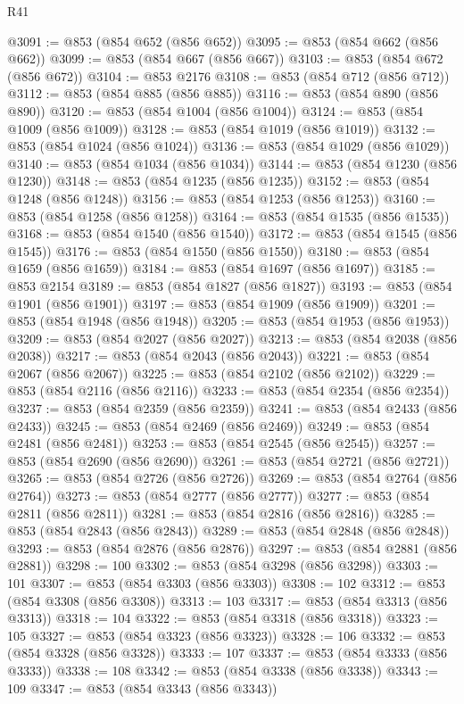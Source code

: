 \begin{lexlean}{R41}
\begin{coremodule}
@3091 := @853 (@854 @652 (@856 @652))
@3095 := @853 (@854 @662 (@856 @662))
@3099 := @853 (@854 @667 (@856 @667))
@3103 := @853 (@854 @672 (@856 @672))
@3104 := @853 @2176
@3108 := @853 (@854 @712 (@856 @712))
@3112 := @853 (@854 @885 (@856 @885))
@3116 := @853 (@854 @890 (@856 @890))
@3120 := @853 (@854 @1004 (@856 @1004))
@3124 := @853 (@854 @1009 (@856 @1009))
@3128 := @853 (@854 @1019 (@856 @1019))
@3132 := @853 (@854 @1024 (@856 @1024))
@3136 := @853 (@854 @1029 (@856 @1029))
@3140 := @853 (@854 @1034 (@856 @1034))
@3144 := @853 (@854 @1230 (@856 @1230))
@3148 := @853 (@854 @1235 (@856 @1235))
@3152 := @853 (@854 @1248 (@856 @1248))
@3156 := @853 (@854 @1253 (@856 @1253))
@3160 := @853 (@854 @1258 (@856 @1258))
@3164 := @853 (@854 @1535 (@856 @1535))
@3168 := @853 (@854 @1540 (@856 @1540))
@3172 := @853 (@854 @1545 (@856 @1545))
@3176 := @853 (@854 @1550 (@856 @1550))
@3180 := @853 (@854 @1659 (@856 @1659))
@3184 := @853 (@854 @1697 (@856 @1697))
@3185 := @853 @2154
@3189 := @853 (@854 @1827 (@856 @1827))
@3193 := @853 (@854 @1901 (@856 @1901))
@3197 := @853 (@854 @1909 (@856 @1909))
@3201 := @853 (@854 @1948 (@856 @1948))
@3205 := @853 (@854 @1953 (@856 @1953))
@3209 := @853 (@854 @2027 (@856 @2027))
@3213 := @853 (@854 @2038 (@856 @2038))
@3217 := @853 (@854 @2043 (@856 @2043))
@3221 := @853 (@854 @2067 (@856 @2067))
@3225 := @853 (@854 @2102 (@856 @2102))
@3229 := @853 (@854 @2116 (@856 @2116))
@3233 := @853 (@854 @2354 (@856 @2354))
@3237 := @853 (@854 @2359 (@856 @2359))
@3241 := @853 (@854 @2433 (@856 @2433))
@3245 := @853 (@854 @2469 (@856 @2469))
@3249 := @853 (@854 @2481 (@856 @2481))
@3253 := @853 (@854 @2545 (@856 @2545))
@3257 := @853 (@854 @2690 (@856 @2690))
@3261 := @853 (@854 @2721 (@856 @2721))
@3265 := @853 (@854 @2726 (@856 @2726))
@3269 := @853 (@854 @2764 (@856 @2764))
@3273 := @853 (@854 @2777 (@856 @2777))
@3277 := @853 (@854 @2811 (@856 @2811))
@3281 := @853 (@854 @2816 (@856 @2816))
@3285 := @853 (@854 @2843 (@856 @2843))
@3289 := @853 (@854 @2848 (@856 @2848))
@3293 := @853 (@854 @2876 (@856 @2876))
@3297 := @853 (@854 @2881 (@856 @2881))
@3298 := 100
@3302 := @853 (@854 @3298 (@856 @3298))
@3303 := 101
@3307 := @853 (@854 @3303 (@856 @3303))
@3308 := 102
@3312 := @853 (@854 @3308 (@856 @3308))
@3313 := 103
@3317 := @853 (@854 @3313 (@856 @3313))
@3318 := 104
@3322 := @853 (@854 @3318 (@856 @3318))
@3323 := 105
@3327 := @853 (@854 @3323 (@856 @3323))
@3328 := 106
@3332 := @853 (@854 @3328 (@856 @3328))
@3333 := 107
@3337 := @853 (@854 @3333 (@856 @3333))
@3338 := 108
@3342 := @853 (@854 @3338 (@856 @3338))
@3343 := 109
@3347 := @853 (@854 @3343 (@856 @3343))

\end{coremodule}
\end{lexlean}
